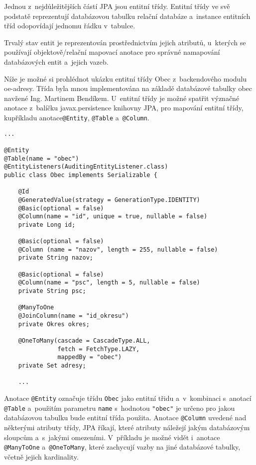 \documentclass[12pt]{article}
\begin{document}
{Jednou z~nejdůležitějších částí JPA jsou entitní třídy.
Entitní třídy ve svě podstatě reprezentují databázovou tabulku
relační databáze a~instance entitních tříd odopovídají jednomu řádku v~tabulce.

Trvalý stav entit je reprezentován prostřednictvím jejich atributů,
u~kterých se používají objektově/relační mapovací anotace 
pro správné namapování databázových entit a~jejich vazeb.

Níže je možné si prohlédnot ukázku entitní třídy Obec z~backendového 
modulu oe-adresy. Třída byla mnou implementována na základě databázové tabulky 
obec navžené Ing. Martinem Bendíkem. U~entitní třídy je možné spatřit 
význačné anotace z~balíčku javax.persistence knihovny JPA,
pro mapování entitní třídy, kupříkladu anotace\texttt{@Entity}, \texttt{@Table}
a~\texttt{@Column}. 

\begin{lstlisting}
...

@Entity
@Table(name = "obec")
@EntityListeners(AuditingEntityListener.class)
public class Obec implements Serializable {

    @Id
    @GeneratedValue(strategy = GenerationType.IDENTITY)
    @Basic(optional = false)
    @Column(name = "id", unique = true, nullable = false)
    private Long id;
    
    @Basic(optional = false)
    @Column (name = "nazov", length = 255, nullable = false)
    private String nazov;
     
    @Basic(optional = false) 
    @Column(name = "psc", length = 5, nullable = false)
    private String psc; 
    
    @ManyToOne
    @JoinColumn(name = "id_okresu")  
    private Okres okres; 
    
    @OneToMany(cascade = CascadeType.ALL,
               fetch = FetchType.LAZY,
               mappedBy = "obec")   
    private Set adresy;
    
    ...
\end{lstlisting}

Anotace \texttt{@Entity} označuje třídu \texttt{Obec}
jako entitní třidu a~v~kombinaci s~anotací \texttt{@Table} 
a~použitím parametru \texttt{name} s~hodnotou \texttt{"obec"} je určeno pro jakou databázovou tabulku bude entitní třída použita.
Anotace \texttt{@Column} uvedené nad některými atributy třídy,
JPA říkají, které atributy náležejí jakým databázovým sloupcům a~s~jakými omezeními.
V~příkladu je možné vidět i~anotace \texttt{@ManyToOne} a~\texttt{@OneToMany},
které zachycují vazby na jiné databázové tabulky, včetně jejich kardinality.

}
\end{document}

